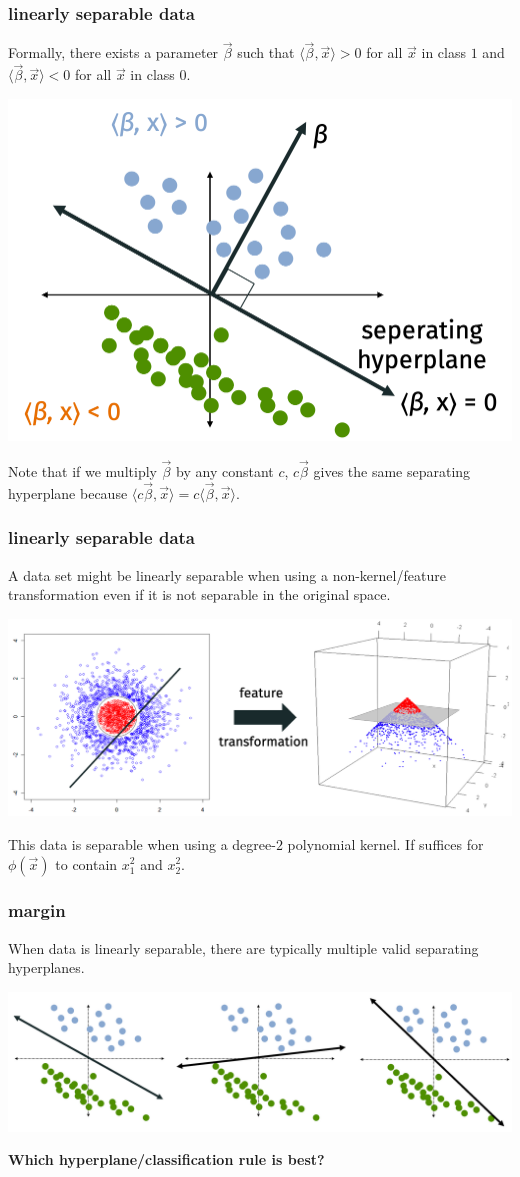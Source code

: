 \documentclass[handout,compress]{beamer}
\begin{document}
\begin{frame}
	\frametitle{linearly separable data}
	Formally, there exists a parameter $\vec{\beta}$ such that $\langle\vec{\beta}, \vec{x}\rangle > 0$ for all $\vec{x}$ in class $1$ and $\langle\vec{\beta}, \vec{x}\rangle < 0$ for all $\vec{x}$ in class $0$.
	\begin{center}
		\includegraphics[width=.6\textwidth]{linear_seperable_math.png}
	\end{center}
	Note that if we multiply $\vec{\beta}$ by any constant $c$, $c\vec{\beta}$ gives the same separating hyperplane because $\langle c\vec{\beta}, \vec{x}\rangle = c\langle\vec{\beta}, \vec{x}\rangle$. 
\end{frame}

\begin{frame}
	\frametitle{linearly separable data}
	A data set might be linearly separable when using a non-kernel/feature transformation even if it is not separable in the original space.
	\begin{center}
		\includegraphics[width=.8\textwidth]{kernel_vis.png}
		
		This data is separable when using a degree-$2$ polynomial kernel. If suffices for $\phi(\vec{x})$ to contain $x_1^2$ and $x_2^2$. 
	\end{center}
\end{frame}

\begin{frame}
	\frametitle{margin}
	\centering
	When data is linearly separable, there are typically multiple valid separating hyperplanes.
	
	\includegraphics[width=\textwidth]{multiple_lines.png}
	
	\textbf{{Which hyperplane/classification rule is best?}}
\end{frame}
\end{document}
